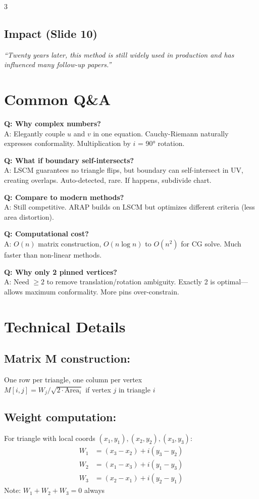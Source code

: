 \documentclass[10pt,landscape]{article}
\begin{document}
\begin{multicols}{3}
\subsection*{Impact (Slide 10)}
\textit{``Twenty years later, this method is still widely used in production and has influenced many follow-up papers.''}

\section*{Common Q\&A}

\textbf{Q: Why complex numbers?}\\
A: Elegantly couple $u$ and $v$ in one equation. Cauchy-Riemann naturally expresses conformality. Multiplication by $i$ = 90° rotation.

\textbf{Q: What if boundary self-intersects?}\\
A: LSCM guarantees no triangle flips, but boundary can self-intersect in UV, creating overlaps. Auto-detected, rare. If happens, subdivide chart.

\textbf{Q: Compare to modern methods?}\\
A: Still competitive. ARAP builds on LSCM but optimizes different criteria (less area distortion).

\textbf{Q: Computational cost?}\\
A: $O(n)$ matrix construction, $O(n \log n)$ to $O(n^2)$ for CG solve. Much faster than non-linear methods.

\textbf{Q: Why only 2 pinned vertices?}\\
A: Need $\geq 2$ to remove translation/rotation ambiguity. Exactly 2 is optimal---allows maximum conformality. More pins over-constrain.

\section*{Technical Details}

\subsection*{Matrix M construction:}
One row per triangle, one column per vertex\\
$M[i,j] = W_j / \sqrt{2 \cdot \text{Area}_i}$ if vertex $j$ in triangle $i$

\subsection*{Weight computation:}
For triangle with local coords $(x_1,y_1), (x_2,y_2), (x_3,y_3)$:
\begin{align*}
W_1 &= (x_3-x_2) + i(y_3-y_2)\\
W_2 &= (x_1-x_3) + i(y_1-y_3)\\
W_3 &= (x_2-x_1) + i(y_2-y_1)
\end{align*}
Note: $W_1 + W_2 + W_3 = 0$ always


\end{multicols}
\end{document}
